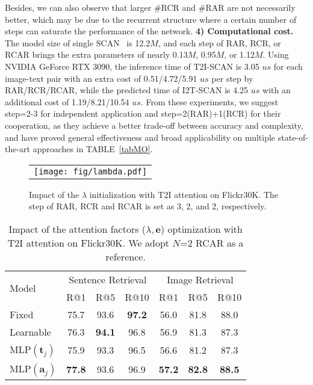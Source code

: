 \documentclass[journal]{IEEEtran}\newcommand{\ignore}[1]{}
\begin{document}
Besides, we can also observe that larger $\#$RCR and $\#$RAR are not necessarily better, which may be due to the recurrent structure where a certain number of steps can saturate the performance of the network. 
\textbf{4) Computational cost.} The model size of single SCAN~\cite{SCAN} is 12.2$M$, and each step of RAR, RCR, or RCAR brings the extra parameters of nearly 0.13$M$, 0.95$M$, or 1.12$M$.
Using NVIDIA GeForce RTX 3090, the inference time of T2I-SCAN is 3.05 $us$ for each image-text pair with an extra cost of 0.51/4.72/5.91 $us$ per step by RAR/RCR/RCAR, while the predicted time of I2T-SCAN is 4.25 $us$ with an additional cost of 1.19/8.21/10.54 $us$.
From these experiments, we suggest step=2-3 for independent application and step=2(RAR)+1(RCR) for their cooperation, as they achieve a better trade-off between accuracy and complexity, and have proved general effectiveness and broad applicability on multiple state-of-the-art approaches in TABLE~\ref{tabMO}.

\begin{figure}[htpb]
	\centering
	\begin{tabular}{@{}c}
    	\texttt{[image: fig/lambda.pdf]} 
	\end{tabular}
	\caption{Impact of the $\lambda$ initialization with T2I attention on Flickr30K. The step of RAR, RCR and RCAR is set as 3, 2, and 2, respectively.}
	\label{fig:lambda}
\end{figure}

\begin{table}
	\centering
	\caption{Impact of the attention factors ($\lambda,\boldsymbol{e}$) optimization with T2I attention on Flickr30K. We adopt $N$=2 RCAR as a reference.}\label{tabRCRfeedback}
		\begin{tabular}{l|cccccc}
			\hline
			\multirow{2}{*}{Model}
			&\multicolumn{3}{c}{Sentence Retrieval}
			&\multicolumn{3}{c}{Image Retrieval}\\
			&R@1&R@5&R@10&R@1&R@5&R@10\\
			\hline 
			Fixed &75.7&93.6&\bf{97.2}&56.0&81.8&88.0\\
			Learnable &76.3&\bf{94.1}&96.8&56.9&81.3&87.3\\
			MLP$(\boldsymbol{t}_j)$ &75.9&93.3&96.5&56.6&81.2&87.3\\
		    MLP$(\boldsymbol{a}_j)$ &\bf{77.8}&93.6&96.9&{\bf57.2}&\bf{82.8}&\bf{88.5}\\
			\hline
		\end{tabular}
\end{table}
\end{document}
